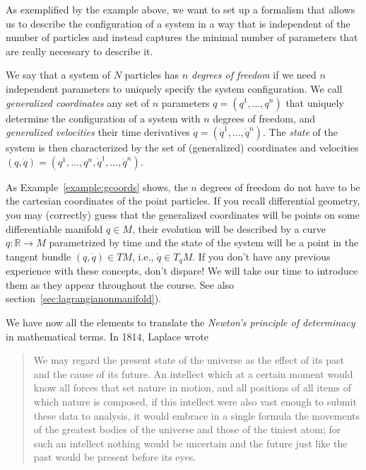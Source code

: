 \documentclass[english,fontsize=11pt,paper=b5]{scrbook}
\numberwithin{equation}{chapter}
\theoremstyle{definition}
\begin{document}
  As exemplified by the example above, we want to set up a formalism that allows us to describe the configuration of a system in a way that is independent of the number of particles and instead captures the minimal number of parameters that are really necessary to describe it.

  We say that a system of $N$ particles has \emph{$n$ degrees of freedom}  if we need $n$ independent parameters to uniquely specify the system configuration.
  We call \emph{generalized coordinates} any set of $n$ parameters $q = (q^1, \ldots, q^n)$ that uniquely determine the configuration of a system with $n$ degrees of freedom, and \emph{generalized velocities}  their time derivatives $\dot q = (\dot q^1, \ldots, \dot q^n)$.
  The \emph{state}  of the system is then characterized by the set of (generalized) coordinates and velocities $(q, \dot q) = \left(q^1, \ldots, q^n,\dot q^1, \ldots, \dot q^n\right)$.

  As Example~\ref{example:gcoords} shows, the $n$ degrees of freedom do not have to be the cartesian coordinates of the point particles.
  If you recall differential geometry, you may (correctly) guess that the generalized coordinates will be points on some differentiable manifold $q\in M$, their evolution will be described by a curve $q: \mathbb{R} \to M$ parametrized by time and the state of the system will be a point in the tangent bundle $(q, \dot q)\in TM$, i.e., $\dot q \in T_q M$. If you don't have any previous experience with these concepts, don't dispare! We will take our time to introduce them as they appear throughout the course. See also section~\ref{sec:lagrangianonmanifold}).
  \medskip

  We have now all the elements to translate the \emph{Newton's principle of determinacy}  in mathematical terms.
  In 1814, Laplace \cite{book:laplace} wrote

  \begin{quotation}
    We may regard the present state of the universe as the effect of its past and the cause of its future. An intellect which at a certain moment would know all forces that set nature in motion, and all positions of all items of which nature is composed, if this intellect were also vast enough to submit these data to analysis, it would embrace in a single formula the movements of the greatest bodies of the universe and those of the tiniest atom; for such an intellect nothing would be uncertain and the future just like the past would be present before its eyes.
  \end{quotation}
\end{document}
